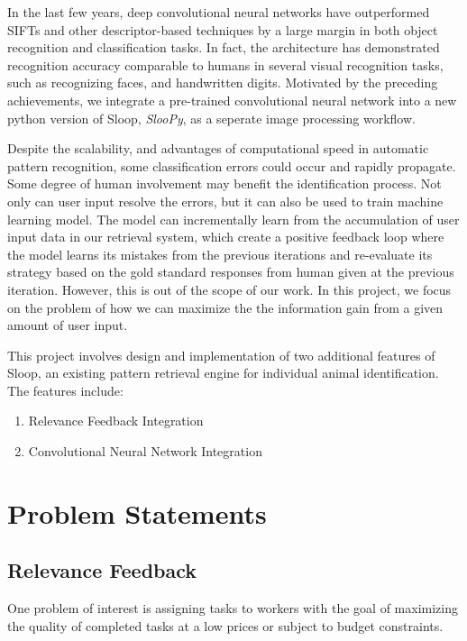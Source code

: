 In the last few years, deep convolutional neural networks\cite{lecun95, kriz12} have outperformed SIFTs and other descriptor-based techniques by a large margin in both object recognition and classification tasks\cite{kriz12, fisher14, ILSVRC15}. In fact, the architecture has demonstrated recognition accuracy comparable to humans in several visual recognition tasks, such as recognizing faces\cite{deepface14}, and handwritten digits\cite{mnist13}. Motivated by the preceding achievements, we integrate a pre-trained convolutional neural network into a new python version of Sloop, \emph{SlooPy}, as a seperate image processing workflow.

Despite the scalability, and advantages of computational speed in automatic pattern recognition, some classification errors could occur and rapidly propagate. Some degree of human involvement may benefit the identification process. Not only can user input resolve the errors, but it can also be used to train machine learning model. The model can incrementally learn from the accumulation of user input data in our retrieval system, which create a positive feedback loop where the model learns its mistakes from the previous iterations and re-evaluate its strategy based on the gold standard responses from human given at the previous iteration. However, this is out of the scope of our work. In this project, we focus on the problem of how we can maximize the the information gain from a given amount of user input.

This project involves design and implementation of two additional features of Sloop, an existing pattern retrieval engine for individual animal identification. The features include:
\begin{enumerate}
	\item Relevance Feedback Integration
	\item Convolutional Neural Network Integration
\end{enumerate}

\section{Problem Statements}

\subsection{Relevance Feedback} %
\label{sub:relevance_feedback}
One problem of interest is assigning tasks to workers with the goal of maximizing the quality of completed tasks at a low prices or subject to budget constraints.

